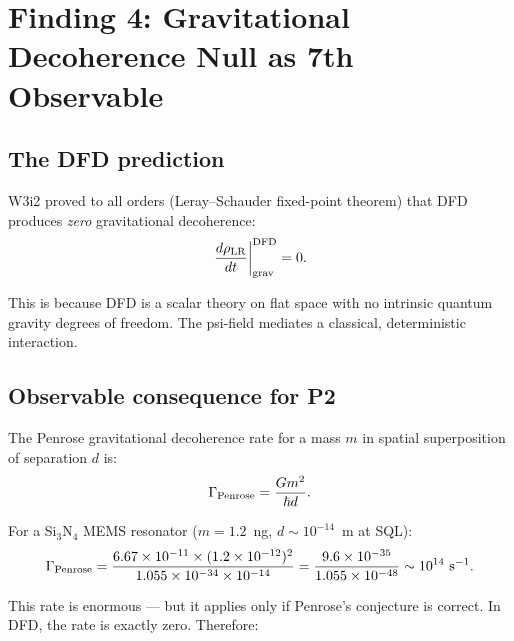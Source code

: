 \documentclass[11pt]{article}
\newcommand{\ee}[1]{\times 10^{#1}}
\theoremstyle{definition}
\theoremstyle{remark}
\begin{document}
\section{Finding 4: Gravitational Decoherence Null as 7th Observable}
\label{sec:grav_decoherence}

\subsection{The DFD prediction}

W3i2 proved to all orders (Leray--Schauder fixed-point theorem) that
DFD produces \emph{zero} gravitational decoherence:
\begin{equation}
\left.\frac{d\rho_{\rm LR}}{dt}\right|_{\rm grav}^{\rm DFD} = 0.
\label{eq:zero_decoherence}
\end{equation}

This is because DFD is a scalar theory on flat space with no
intrinsic quantum gravity degrees of freedom. The psi-field mediates
a classical, deterministic interaction.

\subsection{Observable consequence for P2}

The Penrose gravitational decoherence rate for a mass $m$ in spatial
superposition of separation $d$ is:
\begin{equation}
\Gamma_{\rm Penrose} = \frac{Gm^2}{\hbar d}.
\label{eq:penrose_rate}
\end{equation}

For a Si$_3$N$_4$ MEMS resonator ($m = 1.2$~ng, $d \sim 10^{-14}$~m
at SQL):
\begin{equation}
\Gamma_{\rm Penrose} = \frac{6.67\ee{-11}\times(1.2\ee{-12})^2}
{1.055\ee{-34}\times 10^{-14}}
= \frac{9.6\ee{-35}}{1.055\ee{-48}} \sim 10^{14}~\text{s}^{-1}.
\end{equation}

This rate is enormous --- but it applies only if Penrose's conjecture
is correct. In DFD, the rate is exactly zero. Therefore:
\end{document}
